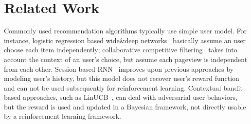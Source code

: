 \documentclass{article} %
\newcommand{\xc}[1]{{\color{blue}{\bf\sf [#1]}}}
\begin{document}


\vspace{-3mm}
\section{Related Work}
\vspace{-3mm}

Commonly used recommendation algorithms typically use simple user model. For instance, logistic regression based wide\&deep networks~\citep{ChengKocHarmsen16} basically assume an user choose each item independently; collaborative competitive filtering~\citep{YanLonSmoEtal11b} takes into account the context of an user's choice, but assume each pageview is independent from each other. 
Session-based RNN~\citep{HidKarBalTik16} improves upon previous approaches by modeling user's history, but this model does not recover user's reward function and can not be used subsequently for reinforcement learning. Contextual bandit based approaches, such as LinUCB~\citep{LiChuLanSch10}, can deal with adversarial user behaviors, but the reward is used and updated in a Bayesian framework, not directly usable by a reinforcement learning framework. 


\end{document}
